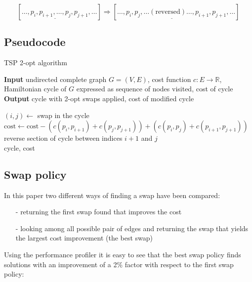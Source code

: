 $$[\ldots,p_i,\underline{p_{i+1},\ldots,p_j},p_{j+1},\ldots]\Rightarrow[\ldots,p_i,\underline{p_j,\ldots(\mbox{reversed})\ldots,p_{i+1}},p_{j+1},\ldots]$$

\subsection{Pseudocode}
\begin{algorithm}
    \caption{TSP 2-opt algorithm}
    \hspace*{\algorithmicindent} \textbf{Input} undirected complete graph $G=(V,E)$, cost function $c:E\rightarrow\mathbb{R}$, Hamiltonian cycle of $G$ expressed as sequence of nodes visited, cost of cycle\\
    \hspace*{\algorithmicindent} \textbf{Output} cycle with 2-opt swaps applied, cost of modified cycle\\
    \begin{algorithmic}

            \State $(i, j)\gets$ swap in the cycle
            \State $\mbox{cost}\gets\mbox{cost}-(c(p_i,p_{i+1})+c(p_j,p_{j+1}))+(c(p_i,p_{j})+c(p_{i+1},p_{j+1}))$
            \State reverse section of cycle between indices $i+1$ and $j$
        \EndWhile\\

        \Return cycle, cost

    \end{algorithmic}
\end{algorithm}

\subsection{Swap policy}

In this paper two different ways of finding a swap have been compared:

\begin{enumerate}
    \item[-] returning the first swap found that improves the cost
    \item[-] looking among all possible pair of edges and returning the swap that yields the largest cost improvement (the best swap)
\end{enumerate}

Using the performance profiler it is easy to see that the best swap policy finds solutions with an improvement of a 2\% factor with respect to the first swap policy:

